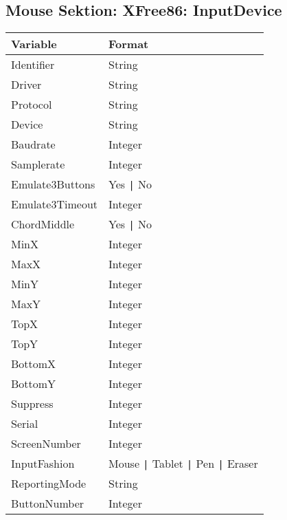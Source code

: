 \subsection{Mouse Sektion: XFree86: InputDevice}
\begin{tabular}[h]{|p{5cm}|p{7cm}|}
 \hline
 \textbf{Variable}     & \textbf{Format}        \\
 \hline
 Identifier       & String                             \\
 Driver           & String                             \\
 Protocol         & String                             \\
 Device           & String                             \\
 Baudrate         & Integer                            \\
 Samplerate       & Integer                            \\
 Emulate3Buttons  & Yes \verb+|+ No                    \\
 Emulate3Timeout  & Integer                            \\
 ChordMiddle      & Yes \verb+|+ No                    \\
 MinX             & Integer                            \\
 MaxX             & Integer                            \\
 MinY             & Integer                            \\
 MaxY             & Integer                            \\
 TopX             & Integer                            \\
 TopY             & Integer                            \\
 BottomX          & Integer                            \\
 BottomY          & Integer                            \\
 Suppress         & Integer                            \\
 Serial           & Integer                            \\
 ScreenNumber     & Integer                            \\
 InputFashion     & Mouse \verb+|+ Tablet \verb+|+ Pen \verb+|+ Eraser \\
 ReportingMode    & String                             \\
 ButtonNumber     & Integer                            \\

\end{tabular}
